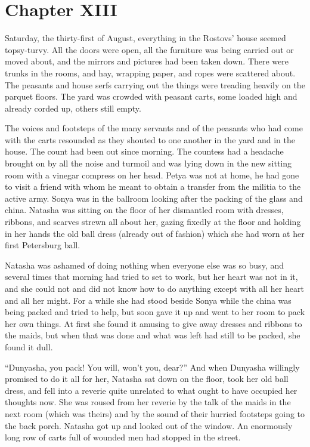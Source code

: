 \chapter*{Chapter XIII} \ifaudio {}
\fi

 Saturday, the thirty-first of August, everything in the
Rostovs' house seemed topsy-turvy. All the doors were open, all
the furniture was being carried out or moved about, and the
mirrors and pictures had been taken down. There were trunks in
the rooms, and hay, wrapping paper, and ropes were scattered
about. The peasants and house serfs carrying out the things were
treading heavily on the parquet floors. The yard was crowded with
peasant carts, some loaded high and already corded up, others
still empty.

The voices and footsteps of the many servants and of the peasants
who had come with the carts resounded as they shouted to one
another in the yard and in the house. The count had been out
since morning. The countess had a headache brought on by all the
noise and turmoil and was lying down in the new sitting room with
a vinegar compress on her head.  Petya was not at home, he had
gone to visit a friend with whom he meant to obtain a transfer
from the militia to the active army. Sonya was in the ballroom
looking after the packing of the glass and china. Natasha was
sitting on the floor of her dismantled room with dresses,
ribbons, and scarves strewn all about her, gazing fixedly at the
floor and holding in her hands the old ball dress (already out of
fashion) which she had worn at her first Petersburg ball.

Natasha was ashamed of doing nothing when everyone else was so
busy, and several times that morning had tried to set to work,
but her heart was not in it, and she could not and did not know
how to do anything except with all her heart and all her
might. For a while she had stood beside Sonya while the china was
being packed and tried to help, but soon gave it up and went to
her room to pack her own things. At first she found it amusing to
give away dresses and ribbons to the maids, but when that was
done and what was left had still to be packed, she found it dull.

``Dunyasha, you pack! You will, won't you, dear?'' And when
Dunyasha willingly promised to do it all for her, Natasha sat
down on the floor, took her old ball dress, and fell into a
reverie quite unrelated to what ought to have occupied her
thoughts now. She was roused from her reverie by the talk of the
maids in the next room (which was theirs) and by the sound of
their hurried footsteps going to the back porch. Natasha got up
and looked out of the window. An enormously long row of carts
full of wounded men had stopped in the street.


